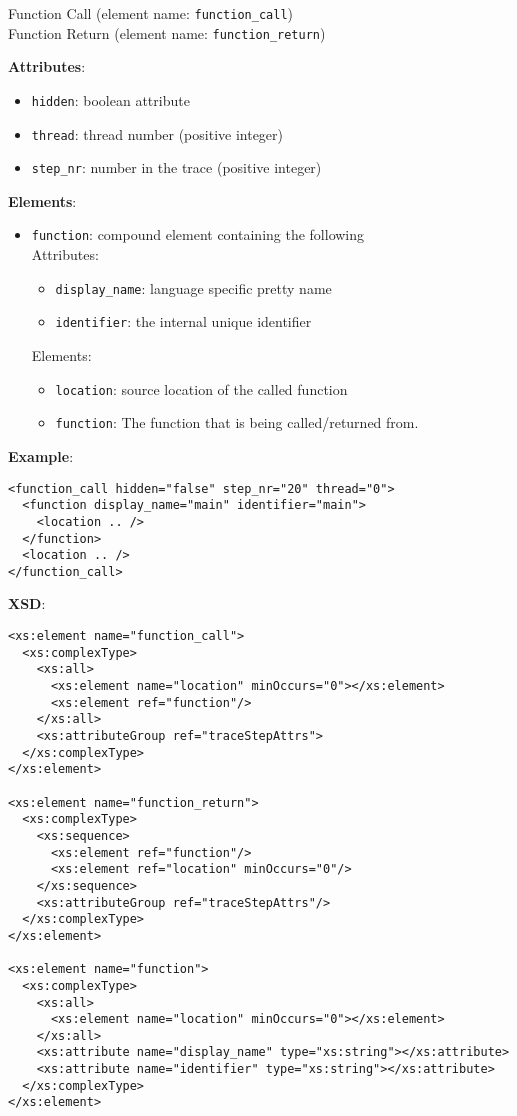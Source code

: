 \documentclass[12pt]{article}
\begin{document}
\begin{center}
  {\Large Function Call} (element name: \texttt{function\_call})\\
  {\Large Function Return} (element name: \texttt{function\_return})
\end{center}

\noindent\textbf{Attributes}:
\begin{itemize}
\item \texttt{hidden}: boolean attribute
\item \texttt{thread}: thread number (positive integer)
\item \texttt{step\_nr}: number in the trace (positive integer)
\end{itemize}

\noindent\textbf{Elements}:
\begin{itemize}
\item \texttt{function}: compound element containing the following\\
  Attributes:
  \begin{itemize}
  \item \texttt{display\_name}: language specific pretty name
  \item \texttt{identifier}: the internal unique identifier
  \end{itemize}
  Elements:
  \begin{itemize}
  \item \texttt{location}: source location of the called function
  \item \texttt{function}: The function that is being called/returned from.
  \end{itemize}
\end{itemize}

\noindent\textbf{Example}:
\begin{verbatim}
<function_call hidden="false" step_nr="20" thread="0">
  <function display_name="main" identifier="main">
    <location .. />
  </function>
  <location .. />
</function_call>
\end{verbatim}

\noindent\textbf{XSD}:
\begin{verbatim}
<xs:element name="function_call">
  <xs:complexType>
    <xs:all>
      <xs:element name="location" minOccurs="0"></xs:element>
      <xs:element ref="function"/>
    </xs:all>
    <xs:attributeGroup ref="traceStepAttrs">
  </xs:complexType>
</xs:element>

<xs:element name="function_return">
  <xs:complexType>
    <xs:sequence>
      <xs:element ref="function"/>
      <xs:element ref="location" minOccurs="0"/>
    </xs:sequence>
    <xs:attributeGroup ref="traceStepAttrs"/>
  </xs:complexType>
</xs:element>

<xs:element name="function">
  <xs:complexType>
    <xs:all>
      <xs:element name="location" minOccurs="0"></xs:element>
    </xs:all>
    <xs:attribute name="display_name" type="xs:string"></xs:attribute>
    <xs:attribute name="identifier" type="xs:string"></xs:attribute>
  </xs:complexType>
</xs:element>
\end{verbatim}
\end{document}
